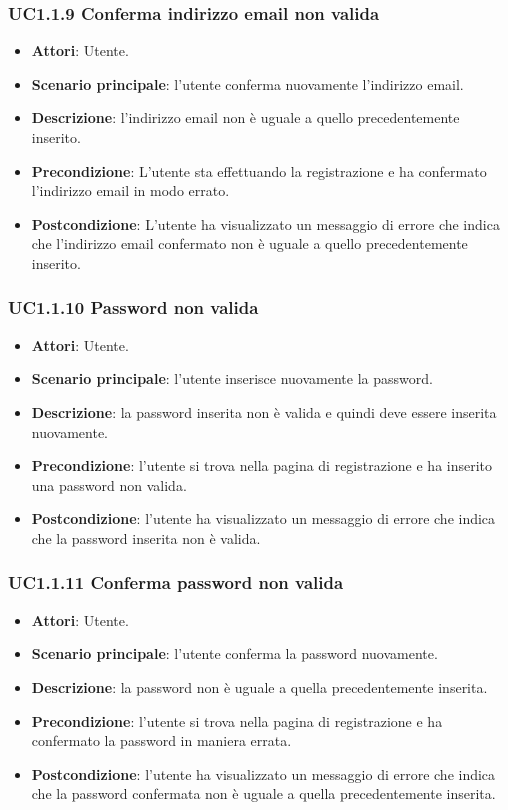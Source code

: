 \subsubsection{UC1.1.9 Conferma indirizzo email non valida}
\begin{itemize}
\item \textbf{Attori}: Utente.
\item \textbf{Scenario principale}: l'utente conferma nuovamente l'indirizzo email.
\item \textbf{Descrizione}: l'indirizzo email non è uguale a quello precedentemente inserito.
\item \textbf{Precondizione}: L'utente sta effettuando la registrazione e ha confermato l'indirizzo email in modo errato.
\item \textbf{Postcondizione}: L'utente ha visualizzato un messaggio di errore che indica che l'indirizzo email confermato non è uguale a quello precedentemente inserito.
\end{itemize}
\subsubsection{UC1.1.10 Password non valida}
\begin{itemize}
\item \textbf{Attori}: Utente.
\item \textbf{Scenario principale}: l'utente inserisce nuovamente la password.
\item \textbf{Descrizione}: la password inserita non è valida e quindi deve essere inserita nuovamente.
\item \textbf{Precondizione}: l'utente si trova nella pagina di registrazione e ha inserito una password non valida.
\item \textbf{Postcondizione}: l'utente ha visualizzato un messaggio di errore che indica che la password inserita non è valida.
\end{itemize}
\subsubsection{UC1.1.11 Conferma password non valida}
\begin{itemize}
\item \textbf{Attori}: Utente.
\item \textbf{Scenario principale}: l'utente conferma la password nuovamente.
\item \textbf{Descrizione}: la password non è uguale a quella precedentemente inserita.
\item \textbf{Precondizione}: l'utente si trova nella pagina di registrazione e ha confermato la password in maniera errata.
\item \textbf{Postcondizione}: l'utente ha visualizzato un messaggio di errore che indica che la password confermata non è uguale a quella precedentemente inserita.
\end{itemize}
